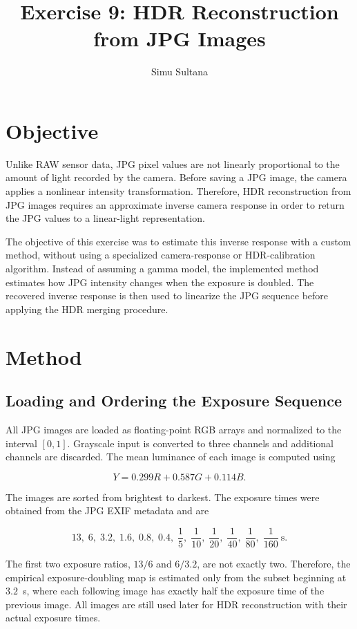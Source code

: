 \documentclass[11pt,a4paper]{article}
\title{\textbf{Exercise 9: HDR Reconstruction from JPG Images}}
\author{Simu Sultana}
\date{}
\begin{document}
\maketitle

\section{Objective}

Unlike RAW sensor data, JPG pixel values are not linearly proportional to the amount of light recorded by the camera. Before saving a JPG image, the camera applies a nonlinear intensity transformation. Therefore, HDR reconstruction from JPG images requires an approximate inverse camera response in order to return the JPG values to a linear-light representation.

The objective of this exercise was to estimate this inverse response with a custom method, without using a specialized camera-response or HDR-calibration algorithm. Instead of assuming a gamma model, the implemented method estimates how JPG intensity changes when the exposure is doubled. The recovered inverse response is then used to linearize the JPG sequence before applying the HDR merging procedure.

\section{Method}

\subsection{Loading and Ordering the Exposure Sequence}

All JPG images are loaded as floating-point RGB arrays and normalized to the interval $[0,1]$. Grayscale input is converted to three channels and additional channels are discarded. The mean luminance of each image is computed using

\[
Y = 0.299R + 0.587G + 0.114B.
\]

The images are sorted from brightest to darkest. The exposure times were obtained from the JPG EXIF metadata and are

\[
13,\;6,\;3.2,\;1.6,\;0.8,\;0.4,\;\frac{1}{5},\;\frac{1}{10},\;\frac{1}{20},\;\frac{1}{40},\;\frac{1}{80},\;\frac{1}{160}\ \text{s}.
\]

The first two exposure ratios, $13/6$ and $6/3.2$, are not exactly two. Therefore, the empirical exposure-doubling map is estimated only from the subset beginning at $3.2$~s, where each following image has exactly half the exposure time of the previous image. All images are still used later for HDR reconstruction with their actual exposure times.
\end{document}
